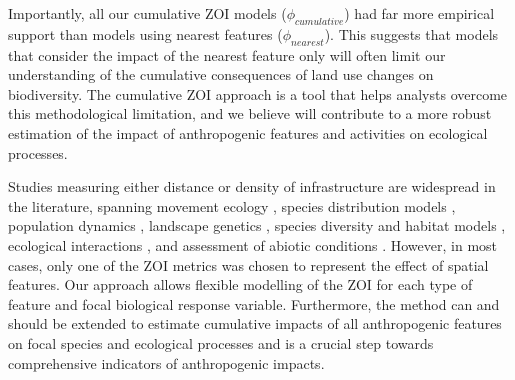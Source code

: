 \documentclass[titlepage]{article}
\begin{document}
Importantly, all our cumulative ZOI models ($\phi_{cumulative}$) had far more empirical support than models using nearest features ($\phi_{nearest}$). This suggests that models that consider the impact of the nearest feature only will often limit our understanding of the cumulative consequences of land use changes on biodiversity. The cumulative ZOI approach is a tool that helps analysts overcome this methodological limitation, and we believe will contribute to a more robust estimation of the impact of anthropogenic features and activities on ecological processes.

Studies measuring either distance or density of infrastructure are widespread in the literature, spanning movement ecology \citep{zeller_multi-level_2017}, species distribution models \citep{panzacchi_searching_2015}, population dynamics \citep{moraga_scale_2019}, landscape genetics \citep{collevatti_multi-scale_2020}, species diversity and habitat models \citep{ficetola_ecological_2009}, ecological interactions \citep{marjakangas_fragmented_2020}, and assessment of abiotic conditions \citep[][Appendix B]{liu_impacts_2018}. However, in most cases, only one of the ZOI metrics was chosen to represent the effect of spatial features. Our approach allows flexible modelling of the ZOI for each type of feature and focal biological response variable. Furthermore, the method can and should be extended to estimate cumulative impacts of all anthropogenic features on focal species and ecological processes and is a crucial step towards comprehensive indicators of anthropogenic impacts.
\end{document}
